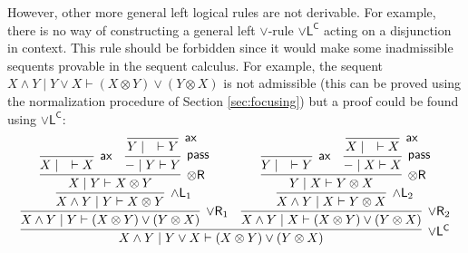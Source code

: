 \documentclass[submission,copyright,creativecommons]{eptcs}
\theoremstyle{definition}
\newcommand{\tr}{\otimes \mathsf{R}}
\newcommand{\pass}{\mathsf{pass}}
\newcommand{\andlone}{\land \mathsf{L}_{1}}
\newcommand{\andltwo}{\land \mathsf{L}_{2}}
\newcommand{\orl}{\lor \mathsf{L}}
\newcommand{\orrone}{\lor \mathsf{R}_{1}}
\newcommand{\orrtwo}{\lor \mathsf{R}_{2}}
\newcommand{\ax}{\mathsf{ax}}
\newcommand{\ot}{\otimes}
\begin{document}
However, other more general left logical rules are not derivable. For example, there is no way of constructing a general left $\lor$-rule $\orl^{\mathsf{C}}$ acting on a disjunction in context. This rule should be forbidden since it would make some inadmissible sequents provable in the sequent calculus. 
For example, the sequent $X \land Y \mid Y \lor X \vdash (X \ot Y) \lor (Y \ot X)$ is not admissible (this can be proved using the normalization procedure of Section \ref{sec:focusing}) but a proof could be found using $\orl^{\mathsf{C}}$:
\begin{displaymath}
  \begin{array}{c}
  \infer[\orl^{\mathsf{C}}]{X \land Y \mid Y \lor X \vdash (X \ot Y) \lor (Y \ot X)}{
    \infer[\orrone]{X \land Y \mid Y \vdash (X \ot Y) \lor (Y \ot X)}{
      \infer[\andlone]{X \land Y \mid Y \vdash X \ot Y}{
        \infer[\tr]{X \mid Y \vdash X \ot Y}{
          \infer[\ax]{X \mid \quad \vdash X}{}
          &
          \infer[\pass]{- \mid Y \vdash Y}{
            \infer[\ax]{Y \mid \quad \vdash Y}{}
          }
        }
      }
    }
    &
    \infer[\orrtwo]{X \land Y \mid X \vdash (X \ot Y) \lor (Y \ot X)}{
      \infer[\andltwo]{X \land Y \mid X \vdash Y \ot X}{
        \infer[\tr]{Y \mid X \vdash Y \ot X}{
          \infer[\ax]{Y \mid \quad \vdash Y}{}
          &
          \infer[\pass]{- \mid X \vdash X}{
            \infer[\ax]{X \mid \quad \vdash X}{}
          }
        }
      }
    }
  }
  \end{array}
\end{displaymath}
\end{document}
